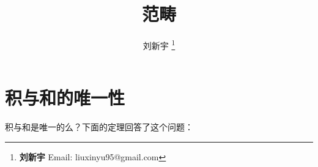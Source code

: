 \documentclass[UTF8]{article}
\begin{document}
\title{范畴}

\author{刘新宇
\thanks{{\bfseries 刘新宇} \newline
  Email: liuxinyu95@gmail.com \newline}
  }

\maketitle
\fi


\chapter*{积与和的唯一性}

积与和是唯一的么？下面的定理回答了这个问题：
\end{document}
